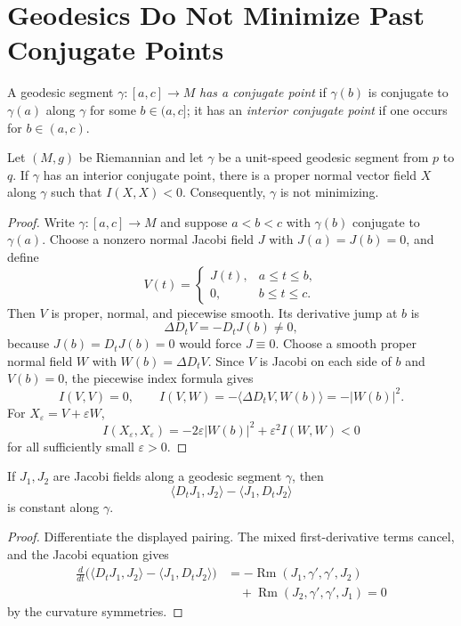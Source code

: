 \section{Geodesics Do Not Minimize Past Conjugate Points}

A geodesic segment $\gamma\colon[a,c]\to M$ \emph{has a conjugate point} if
$\gamma(b)$ is conjugate to $\gamma(a)$ along $\gamma$ for some
$b\in(a,c]$; it has an \emph{interior conjugate point} if one occurs for
$b\in(a,c)$.

\begin{theorem}
\label{thm:no-minimize-past-conjugate}
Let $(M,g)$ be Riemannian and let $\gamma$ be a unit-speed geodesic segment
from $p$ to $q$. If $\gamma$ has an interior conjugate point, there is a proper
normal vector field $X$ along $\gamma$ such that $I(X,X)<0$. Consequently,
$\gamma$ is not minimizing.
\end{theorem}

\begin{proof}
\sketch Write $\gamma\colon[a,c]\to M$ and suppose
$a<b<c$ with $\gamma(b)$ conjugate to $\gamma(a)$. Choose a nonzero normal
Jacobi field $J$ with $J(a)=J(b)=0$, and define
\[
V(t)=
\begin{cases}
J(t),&a\leq t\leq b,\\
0,&b\leq t\leq c.
\end{cases}
\]
Then $V$ is proper, normal, and piecewise smooth. Its derivative jump at $b$ is
\[
\Delta D_tV=-D_tJ(b)\ne0,
\]
because $J(b)=D_tJ(b)=0$ would force $J\equiv0$. Choose a smooth proper
normal field $W$ with $W(b)=\Delta D_tV$. Since $V$ is Jacobi on each side of
$b$ and $V(b)=0$, the piecewise index formula gives
\[
I(V,V)=0,
\qquad
I(V,W)=-\langle\Delta D_tV,W(b)\rangle=-|W(b)|^2.
\]
For $X_\varepsilon=V+\varepsilon W$,
\[
I(X_\varepsilon,X_\varepsilon)
=-2\varepsilon|W(b)|^2+\varepsilon^2I(W,W)<0
\]
for all sufficiently small $\varepsilon>0$.
\end{proof}

\begin{lemma}
\label{lem:jacobi-field-constant-pairing}
If $J_1,J_2$ are Jacobi fields along a geodesic segment $\gamma$, then
\[
\langle D_tJ_1,J_2\rangle-\langle J_1,D_tJ_2\rangle
\]
is constant along $\gamma$.
\end{lemma}

\begin{proof}
\sketch Differentiate the displayed pairing. The mixed first-derivative terms
cancel, and the Jacobi equation gives
\begin{align*}
\frac d{dt}\bigl(
\langle D_tJ_1,J_2\rangle-\langle J_1,D_tJ_2\rangle
\bigr)
&=-\operatorname{Rm}(J_1,\gamma',\gamma',J_2)\\
&\quad+\operatorname{Rm}(J_2,\gamma',\gamma',J_1)=0
\end{align*}
by the curvature symmetries.
\end{proof}

